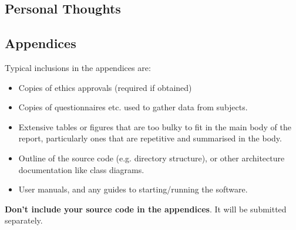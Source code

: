 \documentclass{l4proj}
\theoremstyle{definition}
\begin{document}
\section{Personal Thoughts}

%
% 

\begin{appendices}

\chapter{Appendices}

Typical inclusions in the appendices are:

\begin{itemize}
\item
  Copies of ethics approvals (required if obtained)
\item
  Copies of questionnaires etc. used to gather data from subjects.
\item
  Extensive tables or figures that are too bulky to fit in the main body of
  the report, particularly ones that are repetitive and summarised in the body.

\item Outline of the source code (e.g. directory structure), or other architecture documentation like class diagrams.

\item User manuals, and any guides to starting/running the software.

\end{itemize}

\textbf{Don't include your source code in the appendices}. It will be
submitted separately.

\end{appendices}






\end{document}
